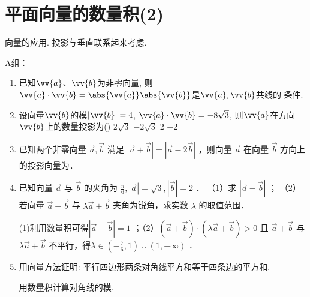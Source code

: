 \clearpage
\section*{平面向量的数量积(2)}
\zsd 向量的应用. 投影与垂直联系起来考虑. 

A组：

\begin{enumerate}

\item 已知$\vv{a}$、$\vv{b}$为非零向量, 则$\vv{a}\cdot\vv{b}=\abs{\vv{a}}\abs{\vv{b}}$是$\vv{a},\vv{b}$共线的 条件.


\item 设向量$\vv{b}$的模$\vert\vv{b}\vert=4$, $\vv{a}\cdot\vv{b}=-8\sqrt{3}$, 则$\vv{a}$在方向$\vv{b}$上的数量投影为\dotfill()
\xx
{$2\sqrt 3$}
{$-2\sqrt 3$}
{$2$}
{$-2$}

\item 已知两个非零向量 $\vec{a}, \vec{b}$ 满足 $|\vec{a}+\vec{b}|=|\vec{a}-2 \vec{b}|$ ，则向量 $\vec{a}$ 在向量 $\vec{b}$ 方向上的投影向量为．

\item 已知向量 $\vec{a}$ 与 $\vec{b}$ 的夹角为 $\frac{\pi}{6},|\vec{a}|=\sqrt{3},|\vec{b}|=2$ ．
（1）求 $|\vec{a}-\vec{b}|$ ；
（2）若向量 $\vec{a}+\vec{b}$ 与 $\lambda \vec{a}+\vec{b}$ 夹角为锐角，求实数 $\lambda$ 的取值范围．
\begin{jieda}
    (1)利用数量积可得$|\vec{a}-\vec{b}|=1$ ；（2）$(\vec{a}+\vec{b}) \cdot(\lambda \vec{a}+\vec{b})>0$ 且 $\vec{a}+\vec{b}$ 与 $\lambda \vec{a}+\vec{b}$ 不平行，得$\lambda \in (-\frac{7}{6},1)\cup (1,+\infty)$ ．
\end{jieda}

\item 用向量方法证明: 平行四边形两条对角线平方和等于四条边的平方和. 
\begin{jieda}
    用数量积计算对角线的模.
\end{jieda}
\end{enumerate}

